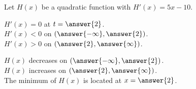 \documentclass{ximera}
\author{Lee Wayand}
\begin{document}
\begin{exercise} 









Let $H(x)$ be a quadratic function with $H'(x) = 5x - 10$. \\






\begin{question}



$H'(x) = 0$  at  $t = \answer{2}$. \\


$H'(x) < 0$ on $\left( \answer{-\infty}, \answer{2} \right)$. \\


$H'(x) > 0$ on $\left( \answer{2}, \answer{\infty} \right)$. \\

\end{question}





\begin{question}



$H(x)$ decreases on $\left( \answer{-\infty}, \answer{2} \right)$. \\


$H(x)$ increases on $\left( \answer{2}, \answer{\infty} \right)$. \\


The minimum of $H(x)$ is located at  $x = \answer{2}$. \\

\end{question}
















\end{exercise}
\end{document}
